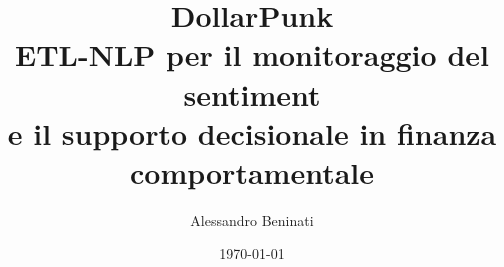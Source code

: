 \title{%
  \textbf{DollarPunk}\\[0.8em]
  {\large ETL-NLP per il monitoraggio del sentiment\\
  e il supporto decisionale in finanza comportamentale}%
}
\author{Alessandro Beninati}
\date{\today}
